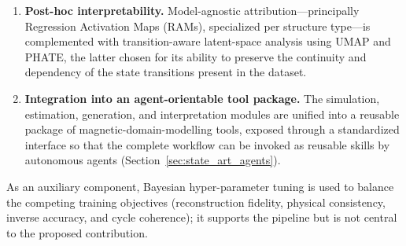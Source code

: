 \documentclass[letterpaper, 12, one column]{article}
\begin{document}
\begin{enumerate}
    \item \textbf{Post-hoc interpretability.} Model-agnostic attribution---principally Regression Activation Maps (RAMs), specialized per structure type---is complemented with transition-aware latent-space analysis using UMAP and PHATE, the latter chosen for its ability to preserve the continuity and dependency of the state transitions present in the dataset.

    \item \textbf{Integration into an agent-orientable tool package.} The simulation, estimation, generation, and interpretation modules are unified into a reusable package of magnetic-domain-modelling tools, exposed through a standardized interface so that the complete workflow can be invoked as reusable skills by autonomous agents (Section~\ref{sec:state_art_agents}).
\end{enumerate}

As an auxiliary component, Bayesian hyper-parameter tuning is used to balance the competing training objectives (reconstruction fidelity, physical consistency, inverse accuracy, and cycle coherence); it supports the pipeline but is not central to the proposed contribution.
\end{document}
